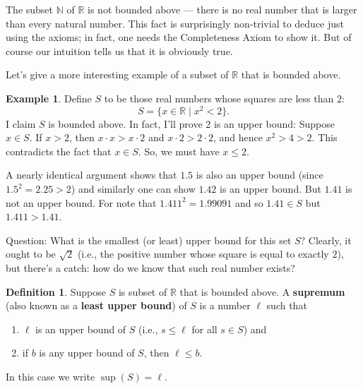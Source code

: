 \documentclass[12pt]{amsart}
\newcommand{\R}{{\mathbb{R}}}
\newcommand{\N}{\mathbb{N}}
\numberwithin{equation}{section}
\theoremstyle{plain} %
\theoremstyle{definition}
\newtheorem{defn}[equation]{Definition}
\newtheorem{ex}[equation]{Example}
\theoremstyle{remark}
\begin{document}
The subset $\N$ of $\R$ is not bounded above --- there is no real
number that is larger than every natural number. This  fact is surprisingly non-trivial to deduce just using
the axioms; in fact, one needs the Completeness Axiom to show it.  But of course our intuition tells us that it is obviously true. 


Let's give a more interesting example of a subset of $\R$ that is bounded above.  

\begin{ex}
Define $S$ to be those real numbers whose squares are less than $2$:
$$
S = \{x \in \R \mid x^2 < 2\}.
$$
I claim $S$ is bounded above. In fact, I'll prove $2$ is an upper
bound: Suppose $x \in S$. If $x > 2$, then $x \cdot x > x \cdot 2$ and $x \cdot 2 > 2 \cdot 2$, and hence $x^2 > 4 > 2$. This contradicts the fact that $x \in
S$. So, we must have $x \leq 2$.

A nearly identical argument shows that $1.5$ is also an upper bound (since $1.5^2 = 2.25 > 2$) and similarly one can show $1.42$ is an upper bound.  
But $1.41$ is not an upper bound.  For note that $1.411^2 = 1.99091$ and so $1.41 \in S$ but $1.411 > 1.41$. 

Question: What is the smallest (or least) upper bound for this set $S$? Clearly, it ought to be $\sqrt{2}$ (i.e., the positive number whose square is equal
to exactly $2$), but there's a catch: how do we know that such real number exists?
\end{ex}


\begin{defn} Suppose $S$ is subset of $\R$ that is bounded above. A \textbf{supremum} (also known as a \textbf{least upper bound}) of $S$ is a number $\ell$ such that
\begin{enumerate}
\item $\ell$ is an upper bound of $S$ (i.e., $s \leq \ell$ for all $s \in S$) and
\item if $b$ is any upper bound of $S$, then $\ell \leq b$. 
\end{enumerate}
In this case we write $\sup(S)=\ell$.\index{$\sup$}
\end{defn}

\newpage


\end{document}
